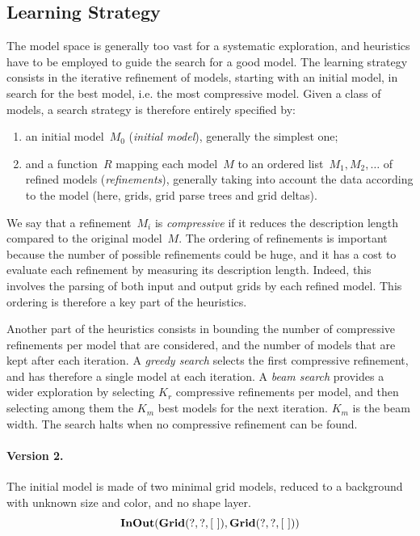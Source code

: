 \documentclass[a4paper]{llncs}
\begin{document}
\subsection{Learning Strategy}
\label{learning:strategy}

The model space is generally too vast for a systematic exploration,
and heuristics have to be employed to guide the search for a good
model.
%
The learning strategy consists in the iterative refinement of models,
starting with an initial model, in search for the best model, i.e. the
most compressive model. Given a class of models, a search strategy is
therefore entirely specified by:
\begin{enumerate}
\item an initial model~$M_0$ ({\em initial model}), generally the
  simplest one;
\item and a function~$R$ mapping each model~$M$ to an ordered
  list~$M_1, M_2, \ldots$ of refined models ({\em refinements}),
  generally taking into account the data according to the model (here,
  grids, grid parse trees and grid deltas).
\end{enumerate}
We say that a refinement~$M_i$ is {\em compressive} if it reduces the
description length compared to the original model~$M$. The ordering of
refinements is important because the number of possible refinements
could be huge, and it has a cost to evaluate each refinement by
measuring its description length. Indeed, this involves the parsing of
both input and output grids by each refined model.  This ordering is
therefore a key part of the heuristics.

Another part of the heuristics consists in bounding the number of
compressive refinements per model that are considered, and the number
of models that are kept after each iteration. A {\em greedy search}
selects the first compressive refinement, and has therefore a single
model at each iteration. A {\em beam search} provides a wider
exploration by selecting $K_r$ compressive refinements per model, and
then selecting among them the $K_m$ best models for the next
iteration. $K_m$ is the beam width. The search halts when no
compressive refinement can be found.

\paragraph{Version 2.} The initial model is made of two minimal grid
models, reduced to a background with unknown size and color, and no
shape layer.
\[ {\bf InOut}({\bf Grid}(?,?,[\ ]), {\bf Grid}(?,?,[\ ])) \]
\end{document}

